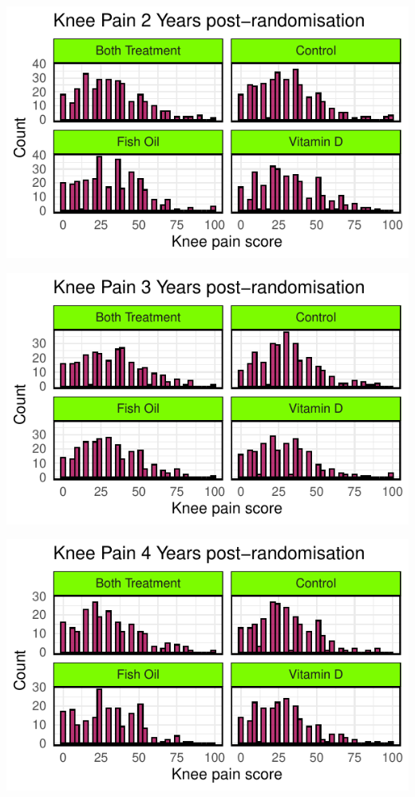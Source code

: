 \documentclass{article}
\newcommand{\pandocbounded}[1]{#1}
\begin{document}
\pandocbounded{\includegraphics[keepaspectratio]{Final_Report_files/figure-latex/unnamed-chunk-21-1.pdf}}

\pandocbounded{\includegraphics[keepaspectratio]{Final_Report_files/figure-latex/unnamed-chunk-22-1.pdf}}

\pandocbounded{\includegraphics[keepaspectratio]{Final_Report_files/figure-latex/unnamed-chunk-23-1.pdf}}
\end{document}

